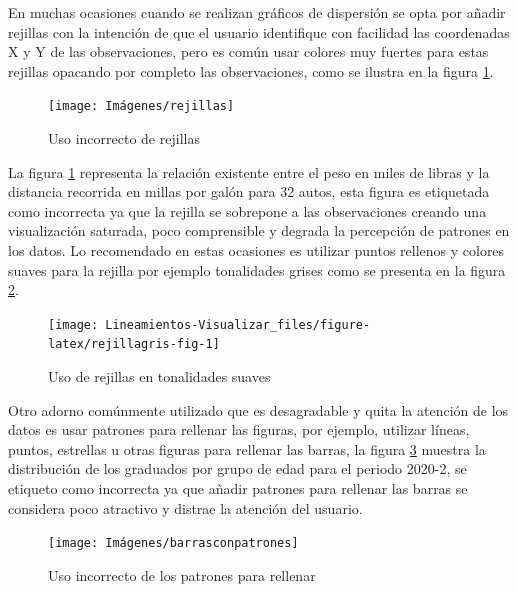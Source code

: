 \documentclass[
]{book}
\begin{document}
En muchas ocasiones cuando se realizan gráficos de dispersión se opta por añadir rejillas con la intención de que el usuario identifique con facilidad las coordenadas X y Y de las observaciones, pero es común usar colores muy fuertes para estas rejillas opacando por completo las observaciones, como se ilustra en la figura \ref{fig:usoderejillas-fig}.

\begin{figure}

{\centering \texttt{[image: Imágenes/rejillas]} 

}

\caption{Uso incorrecto de rejillas}\label{fig:usoderejillas-fig}
\end{figure}

La figura \ref{fig:usoderejillas-fig} representa la relación existente entre el peso en miles de libras y la distancia recorrida en millas por galón para 32 autos, esta figura es etiquetada como incorrecta ya que la rejilla se sobrepone a las observaciones creando una visualización saturada, poco comprensible y degrada la percepción de patrones en los datos. Lo recomendado en estas ocasiones es utilizar puntos rellenos y colores suaves para la rejilla por ejemplo tonalidades grises como se presenta en la figura \ref{fig:rejillagris-fig}.

\begin{figure}

{\centering \texttt{[image: Lineamientos-Visualizar\_files/figure-latex/rejillagris-fig-1]} 

}

\caption{Uso de rejillas en tonalidades suaves}\label{fig:rejillagris-fig}
\end{figure}

Otro adorno comúnmente utilizado que es desagradable y quita la atención de los datos es usar patrones para rellenar las figuras, por ejemplo, utilizar líneas, puntos, estrellas u otras figuras para rellenar las barras, la figura \ref{fig:barrasconpatrones-fig} muestra la distribución de los graduados por grupo de edad para el periodo 2020-2, se etiqueto como incorrecta ya que añadir patrones para rellenar las barras se considera poco atractivo y distrae la atención del usuario.

\begin{figure}

{\centering \texttt{[image: Imágenes/barrasconpatrones]} 

}

\caption{Uso incorrecto de los patrones para rellenar}\label{fig:barrasconpatrones-fig}
\end{figure}
\end{document}
